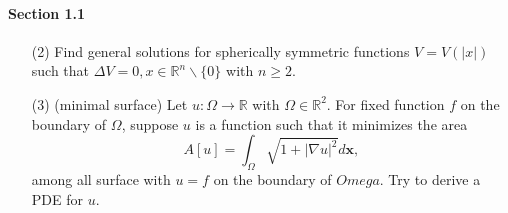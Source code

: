 \paragraph*{Section 1.1}
\begin{itemize}
    \item [(2)] Find general solutions for spherically symmetric functions 
    $V = V(|x|)$ such that 
    $\Delta V = 0, x \in \mathbb{R}^n \backslash \{0\}$ with $n \geq 2$.

    \item [(3)] (minimal surface) Let $u : \Omega \rightarrow \mathbb{R}$
    with $\Omega \in \mathbb{R}^2$. For fixed function $f$ on the boundary of 
    $\Omega$, suppose $u$ is a function such that it minimizes the area
    \[ A[u] = \int_{\Omega} \sqrt{1 + | \nabla u|^2 } d\mathbf{x} ,\]
    among all surface with $u = f$ on the boundary of $Omega$. 
    Try to derive a PDE for $u$.
\end{itemize}

